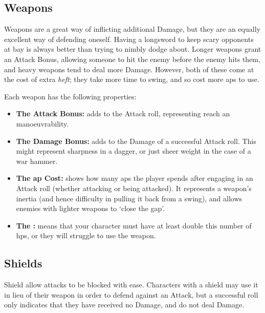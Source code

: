 \begin{multicols}{2}

\subsection{Weapons}

\noindent
Weapons are a great way of inflicting additional Damage, but they are an equally excellent way of defending oneself.
Having a longsword to keep scary opponents at bay is always better than trying to nimbly dodge about.
Longer weapons grant an Attack Bonus, allowing someone to hit the enemy before the enemy hits them, and heavy weapons tend to deal more Damage.
However, both of these come at the cost of extra \emph{heft}; they take more time to swing, and so cost more \glspl{ap} to use.

Each weapon has the following properties:

\begin{itemize}

  \item
  \textbf{The Attack Bonus:} adds to the Attack roll, representing reach an manoeuvrability.
  \item
  \textbf{The Damage Bonus:} adds to the Damage of a successful Attack roll.
  This might represent sharpness in a dagger, or just sheer weight in the case of a war hammer.
  \item
  \textbf{The \Gls{ap} Cost:} shows how many \glspl{ap} the player spends after engaging in an Attack roll (whether attacking or being attacked).
  It represents a weapon's inertia (and hence difficulty in pulling it back from a swing), and allows enemies with lighter weapons to `close the gap'.
  \item
  \textbf{The :} means that your character must have at least double this number of \glspl{hp}, or they will struggle to use the weapon.
\end{itemize}

\weaponsChart

\bigLine

\label{weaponschart}

\subsection{Shields}

Shield allow attacks to be blocked with ease.
Characters with a shield may use it in lieu of their weapon in order to defend against an Attack, but a successful roll only indicates that they have received no Damage, and do not deal Damage.


\end{multicols}
